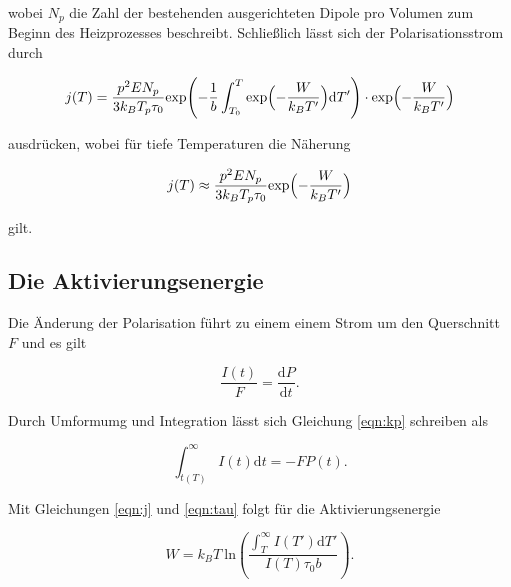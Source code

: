 \noindent
wobei $N_p$ die Zahl der bestehenden ausgerichteten Dipole pro Volumen zum Beginn des Heizprozesses beschreibt.
Schließlich lässt sich der Polarisationsstrom durch

\begin{equation}
    j(T) = \frac{p^2 E N_p}{3 k_B T_p \tau_0} \text{exp} \Biggl(-\frac{1}{b} \int_{T_0}^{T} \text{exp} \Bigl( - \frac{W}{k_B T'} \Bigr) \text{d}T' \Biggr)\cdot 
    \text{exp} \Bigl( - \frac{W}{k_B T'} \Bigr)
\end{equation}

\noindent
ausdrücken, wobei für tiefe Temperaturen die Näherung

\begin{equation}
    j(T) \approx \frac{p^2 E N_p}{3 k_B T_p \tau_0} \text{exp} \Bigl( - \frac{W}{k_B T'} \Bigr)
\end{equation}

\noindent
gilt.

\subsection{Die Aktivierungsenergie}
Die Änderung der Polarisation führt  zu einem einem Strom um den Querschnitt $F$ und es gilt

\begin{equation}
    \label{eqn:kp}
\frac{I(t)}{F} = \frac{\text{d}P}{\text{d}t}.
\end{equation}

\noindent
Durch Umformumg und Integration lässt sich Gleichung \ref{eqn:kp} schreiben als

\begin{equation}
    \int_{t(T)}^{\infty} I(t) \text{d}t = - F P(t).
    \end{equation}

\noindent
Mit Gleichungen \ref{eqn:j} und \ref{eqn:tau} folgt für die Aktivierungsenergie

\begin{equation}
    \label{eqn:idkwhat}
W= k_B T \:\text{ln} \left( \frac{\int_{T}^{\infty} I(T') \text{d} T'}{I(T) \tau_0 b}\right).
\end{equation}
